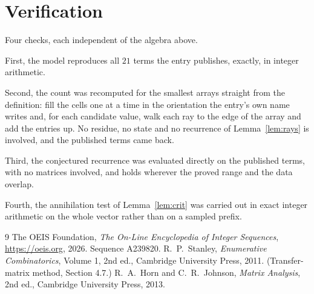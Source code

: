 \documentclass[11pt,a4paper]{article}
\theoremstyle{plain}
\theoremstyle{definition}
\begin{document}
\section{Verification}

Four checks, each independent of the algebra above.

First, the model reproduces all $21$ terms the entry publishes, exactly, in integer
arithmetic.

Second, the count was recomputed for the smallest arrays straight from the definition: fill the
cells one at a time in the orientation the entry's own name writes and, for each candidate
value, walk each ray to the edge of the array and add the entries up. No residue, no state and
no recurrence of Lemma~\ref{lem:rays} is involved, and the published terms came back.

Third, the conjectured recurrence was evaluated directly on the published terms, with no
matrices involved, and holds wherever the proved range and the data overlap.

Fourth, the annihilation test of Lemma~\ref{lem:crit} was carried out in exact integer
arithmetic on the whole vector rather than on a sampled prefix.

\begin{thebibliography}{9}
 The OEIS Foundation, \emph{The On-Line Encyclopedia of Integer
Sequences}, \url{https://oeis.org}, 2026. Sequence A239820.
 R.~P.~Stanley, \emph{Enumerative Combinatorics}, Volume 1, 2nd ed.,
Cambridge University Press, 2011. (Transfer-matrix method, Section 4.7.)
 R.~A.~Horn and C.~R.~Johnson, \emph{Matrix Analysis}, 2nd ed., Cambridge
University Press, 2013.
\end{thebibliography}
\end{document}
